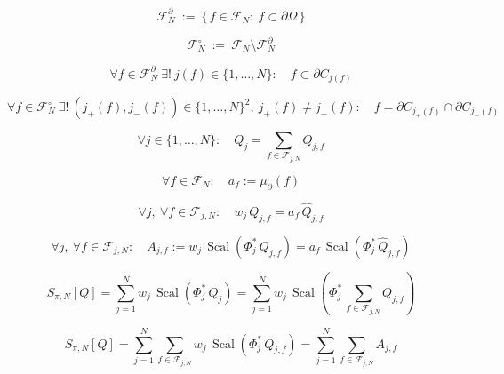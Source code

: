 \documentclass[12pt]{article}
\begin{document}
\begin{equation}
\mathcal{F}_N^\partial\ :=\ \bigl\{\,f\in\mathcal{F}_N:\ f\subset\partial\Omega\,\bigr\}
\end{equation}

\begin{equation}
\mathcal{F}_N^\circ\ :=\ \mathcal{F}_N\setminus\mathcal{F}_N^\partial
\end{equation}

\begin{equation}
\forall f\in\mathcal{F}_N^\partial\ \exists!\ j(f)\in\{1,\dots,N\}:\quad f\subset\partial C_{j(f)}
\end{equation}

\begin{equation}
\forall f\in\mathcal{F}_N^\circ\ \exists!\ (j_+(f),j_-(f))\in\{1,\dots,N\}^2,\ j_+(f)\neq j_-(f):\quad f=\partial C_{j_+(f)}\cap\partial C_{j_-(f)}
\end{equation}

\begin{equation}
\forall j\in\{1,\dots,N\}:\quad Q_j=\sum_{f\in\mathcal{F}_{j,N}}Q_{j,f}
\end{equation}

\begin{equation}
\forall f\in\mathcal{F}_N:\quad a_f:=\mu_{\partial}(f)
\end{equation}

\begin{equation}
\forall j,\ \forall f\in\mathcal{F}_{j,N}:\quad w_j\,Q_{j,f}=a_f\,\widehat{Q}_{j,f}
\end{equation}

\begin{equation}
\forall j,\ \forall f\in\mathcal{F}_{j,N}:\quad
A_{j,f}:=w_j\,\operatorname{Scal}\!\left(\Phi_j^*\,Q_{j,f}\right)
=a_f\,\operatorname{Scal}\!\left(\Phi_j^*\,\widehat{Q}_{j,f}\right)
\end{equation}

\begin{equation}
S_{\pi,N}[Q]
=\sum_{j=1}^N w_j\,\operatorname{Scal}\!\left(\Phi_j^*\,Q_j\right)
=\sum_{j=1}^N w_j\,\operatorname{Scal}\!\left(\Phi_j^*\,\sum_{f\in\mathcal{F}_{j,N}}Q_{j,f}\right)
\end{equation}

\begin{equation}
S_{\pi,N}[Q]
=\sum_{j=1}^N\sum_{f\in\mathcal{F}_{j,N}}w_j\,\operatorname{Scal}\!\left(\Phi_j^*\,Q_{j,f}\right)
=\sum_{j=1}^N\sum_{f\in\mathcal{F}_{j,N}}A_{j,f}
\end{equation}
\end{document}
